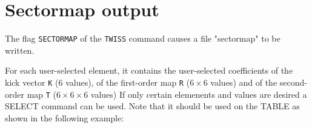 %
\section{Sectormap output}
\label{sec:sectormap}

The flag \texttt{SECTORMAP} of the \texttt{TWISS} command causes a file "sectormap" to be
written.

For each user-selected element, it contains the user-selected coefficients of 
the kick vector \texttt{K} ($6$ values), of the first-order map \texttt{R} 
($6\times6$ values) and of the second-order map \texttt{T} ($6\times6\times6$ 
values)
If only certain elemenents and values are desired a SELECT command can be used. 
Note that it should be used on the TABLE as shown in the following example:
  


